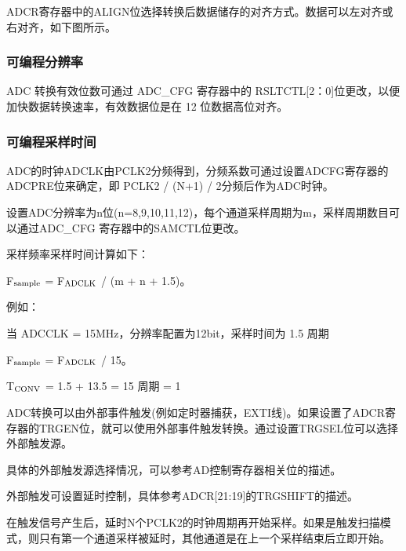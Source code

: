 
ADCR寄存器中的ALIGN位选择转换后数据储存的对齐方式。数据可以左对齐或右对齐，如下图所示。\par 


\subsubsection{可编程分辨率}
ADC 转换有效位数可通过 ADC\_CFG 寄存器中的 RSLTCTL[2：0]位更改，以便加快数据转换速率，有效数据位是在 12 位数据高位对齐。\par

\subsubsection{可编程采样时间}
ADC的时钟ADCLK由PCLK2分频得到，分频系数可通过设置ADCFG寄存器的ADCPRE位来确定，即 PCLK2 / (N+1) / 2分频后作为ADC时钟。\par
设置ADC分辨率为n位(n=8,9,10,11,12)，每个通道采样周期为m，采样周期数目可以通过ADC\_CFG 寄存器中的SAMCTL位更改。\par 

采样频率采样时间计算如下：

F$_{\rm sample}$ = F$_{\rm ADCLK}$ / (m + n + 1.5)。

例如：

当 ADCCLK = 15MHz，分辨率配置为12bit，采样时间为 1.5 周期

F$_{\rm sample}$ = F$_{\rm ADCLK}$ / 15。\par 

T$_{\rm CONV}$ = 1.5 + 13.5 = 15 周期 = 1\micro\second


ADC转换可以由外部事件触发(例如定时器捕获，EXTI线)。如果设置了ADCR寄存器的TRGEN位，就可以使用外部事件触发转换。通过设置TRGSEL位可以选择外部触发源。\par 

具体的外部触发源选择情况，可以参考AD控制寄存器相关位的描述。\par 
 

外部触发可设置延时控制，具体参考ADCR[21:19]的TRGSHIFT的描述。\par 


在触发信号产生后，延时N个PCLK2的时钟周期再开始采样。如果是触发扫描模式，则只有第一个通道采样被延时，其他通道是在上一个采样结束后立即开始。\par 

